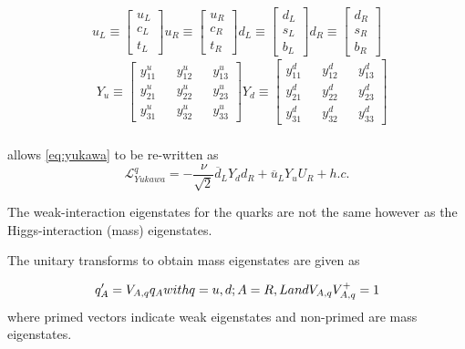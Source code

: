 \begin{equation}
  u_{L} \equiv \begin{bmatrix}u_{L}\\c_{L}\\t_{L}\end{bmatrix}
  u_{R} \equiv \begin{bmatrix}u_{R}\\c_{R}\\t_{R}\end{bmatrix}
  d_{L} \equiv \begin{bmatrix}d_{L}\\s_{L}\\b_{L}\end{bmatrix}
  d_{R} \equiv \begin{bmatrix}d_{R}\\s_{R}\\b_{R}\end{bmatrix}
  \label{eq:yukdef1}
\end{equation}
\begin{equation}
  \begin{split}
    &
    Y_{u} \equiv \begin{bmatrix}y^{u}_{11}&&y^{u}_{12}&&y^{u}_{13}\\y^{u}_{21}&&y^{u}_{22}&&y^{u}_{23}\\y^{u}_{31}&&y^{u}_{32}&&y^{u}_{33}\end{bmatrix}
    Y_{d} \equiv \begin{bmatrix}y^{d}_{11}&&y^{d}_{12}&&y^{d}_{13}\\y^{d}_{21}&&y^{d}_{22}&&y^{d}_{23}\\y^{d}_{31}&&y^{d}_{32}&&y^{d}_{33}\end{bmatrix}
    \\
  \end{split}
\end{equation}

allows \autoref{eq:yukawa} to be re-written as
\begin{equation}
  \mathcal{L}^{q}_{Yukawa} = -\frac{\nu}{\sqrt{2}}{\overline{d}_{L}Y_{d}d_{R} + \overline{u}_{L}Y_{u}U_{R} + h.c.}
\end{equation}


The weak-interaction eigenstates for the quarks are not the same however as the Higgs-interaction (mass) eigenstates.

The unitary transforms to obtain mass eigenstates are given as

\begin{equation}
  q^{\prime}_{A} = V_{A,q}q_{A} $$with$$ q = u,d;   A = R,L $$and$$ V_{A,q}V^{+}_{A,q} = 1
  \label{eq:yukdef2}
\end{equation}
where primed vectors indicate weak eigenstates and non-primed are mass eigenstates.

